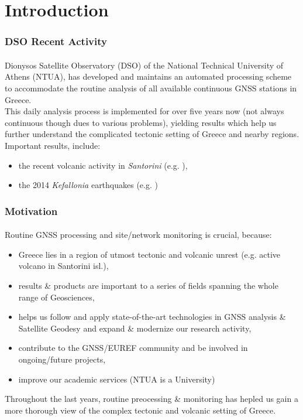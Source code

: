 \graphicspath{{Chapter1/Figs/}}

\section{Introduction}

\begin{frame}\frametitle{DSO Recent Activity}\framesubtitle{}
\vskip-1.5cm
  Dionysos Satellite Observatory (DSO) of the National Technical University of 
  Athens (NTUA), has developed and maintains an automated processing
  scheme to accommodate the routine analysis of all available continuous GNSS 
  stations in Greece.
  \\
  This daily analysis process is implemented for over five years now (not 
  always continuous though dues to various problems), yielding 
  results which help us further understand the complicated tectonic setting of 
  Greece and nearby regions.
  \\
  Important results, include:
  \begin{itemize}
    \item the recent volcanic activity in \emph{Santorini} (e.g. \cite{papoutsis}),
    \item the 2014 \emph{Kefallonia} earthquakes (e.g. \cite{anastasioukef})
  \end{itemize}
\end{frame}
%
\begin{frame}\frametitle{Motivation}\framesubtitle{}
  Routine GNSS processing and site/network monitoring is crucial, because:
  \begin{itemize}
    \item Greece lies in a region of utmost tectonic and volcanic unrest (e.g. 
      active volcano in Santorini isl.),
    \item results \& products are important to a series of fields spanning 
      the whole range of Geosciences,
    \item helps us follow and apply state-of-the-art technologies in GNSS analysis 
      \& Satellite Geodesy and expand \& modernize our research activity,
    \item contribute to the GNSS/EUREF community and be involved in ongoing/future projects,
    \item improve our academic services (NTUA is a University)
  \end{itemize}
  Throughout the last years, routine preocessing \& monitoring has hepled us gain 
  a more thorough view of the complex tectonic and volcanic setting of Greece.
\end{frame}


